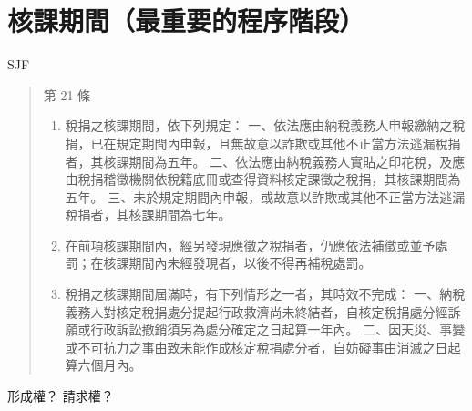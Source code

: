 \documentclass[]{ctexbook}
\providecommand{\tightlist}{%
  \setlength{\itemsep}{0pt}\setlength{\parskip}{0pt}}
\begin{document}
\hypertarget{ux6838ux8ab2ux671fux9593ux6700ux91cdux8981ux7684ux7a0bux5e8fux968eux6bb5}{%
\section{核課期間（最重要的程序階段）}\label{ux6838ux8ab2ux671fux9593ux6700ux91cdux8981ux7684ux7a0bux5e8fux968eux6bb5}}

SJF

\begin{quote}
第 21 條

\begin{enumerate}
\def\labelenumi{\arabic{enumi}.}
\tightlist
\item
  稅捐之核課期間，依下列規定：
  一、依法應由納稅義務人申報繳納之稅捐，已在規定期間內申報，且無故意以詐欺或其他不正當方法逃漏稅捐者，其核課期間為五年。
  二、依法應由納稅義務人實貼之印花稅，及應由稅捐稽徵機關依稅籍底冊或查得資料核定課徵之稅捐，其核課期間為五年。
  三、未於規定期間內申報，或故意以詐欺或其他不正當方法逃漏稅捐者，其核課期間為七年。
\item
  在前項核課期間內，經另發現應徵之稅捐者，仍應依法補徵或並予處罰；在核課期間內未經發現者，以後不得再補稅處罰。
\item
  稅捐之核課期間屆滿時，有下列情形之一者，其時效不完成：
  一、納稅義務人對核定稅捐處分提起行政救濟尚未終結者，自核定稅捐處分經訴願或行政訴訟撤銷須另為處分確定之日起算一年內。
  二、因天災、事變或不可抗力之事由致未能作成核定稅捐處分者，自妨礙事由消滅之日起算六個月內。
\end{enumerate}
\end{quote}

形成權？ 請求權？
\end{document}
